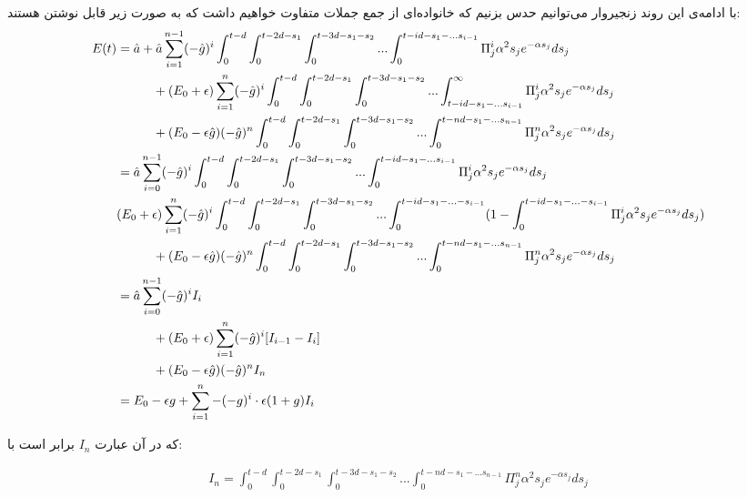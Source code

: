 \begin{landscape}
با ادامه‌ی این روند زنجیروار می‌توانیم حدس بزنیم که خانواده‌ای از جمع جملات متفاوت خواهیم داشت که به صورت زیر قابل نوشتن هستند:
\begin{align}
	E(t) &= \hat{a} + \hat{a} \sum^{n - 1}_{i=1} (-\hat{g})^i \int_{0}^{t - d} \int_{0}^{t - 2d - s_1} \int_{0}^{t - 3d - s_1 - s_2} ... \int_{0}^{t - id - s_1 - ... s_{i-1}} \Pi^i_j \alpha^2 s_j e^{-\alpha s_j} ds_j \\
	&\hspace{1 cm} + (E_0 + \epsilon) \sum^{n}_{i=1} (-\hat{g})^i \int_{0}^{t - d} \int_{0}^{t - 2d - s_1} \int_{0}^{t - 3d - s_1 - s_2} ... \int_{t - id - s_1 - ... s_{i-1}}^{\infty} \Pi^i_j \alpha^2 s_j e^{-\alpha s_j} ds_j \\
	&\hspace{1 cm} + (E_0 - \epsilon \hat{g}) (-\hat{g})^n \int_{0}^{t - d} \int_{0}^{t - 2d - s_1} \int_{0}^{t - 3d - s_1 - s_2} ... \int_{0}^{t - nd - s_1 - ... s_{n-1}} \Pi^n_j \alpha^2 s_j e^{-\alpha s_j} ds_j \\
	&= \hat{a} \sum^{n - 1}_{i=0} (-\hat{g})^i \int_{0}^{t - d} \int_{0}^{t - 2d - s_1} \int_{0}^{t - 3d - s_1 - s_2} ... \int_{0}^{t - id - s_1 - ... s_{i-1}} \Pi^i_j \alpha^2 s_j e^{-\alpha s_j} ds_j \\
	& (E_0 + \epsilon) \sum^{n}_{i=1} (-\hat{g})^i \int_{0}^{t - d} \int_{0}^{t - 2d - s_1} \int_{0}^{t - 3d - s_1 - s_2} ... \int_0^{t - id - s_1 - ... - s_{i-1}} (1 - \int_{0}^{t - id - s_1 - ... - s_{i-1}} \Pi^i_j \alpha^2 s_j e^{-\alpha s_j} ds_j )\\
	&\hspace{1 cm} + (E_0 - \epsilon \hat{g}) (-\hat{g})^n \int_{0}^{t - d} \int_{0}^{t - 2d - s_1} \int_{0}^{t - 3d - s_1 - s_2} ... \int_{0}^{t - nd - s_1 - ... s_{n-1}} \Pi^n_j \alpha^2 s_j e^{-\alpha s_j} ds_j\\
	&= \hat{a} \sum^{n - 1}_{i=0} (-\hat{g})^i I_i\\
	&\hspace{1 cm} + (E_0 + \epsilon) \sum^{n}_{i=1} (-\hat{g})^i [I_{i-1} - I_{i}]  \\
	&\hspace{1 cm} + (E_0 - \epsilon \hat{g}) (-\hat{g})^n I_n \\
	&= E_0 - \epsilon g + \sum^{n}_{i=1} - (-g)^i \cdot \epsilon(1+g) I_{i}
\end{align}
\end{landscape}
که در آن عبارت 
$I_n$
برابر است با:

\begin{align}
	I_n = \int_{0}^{t - d} \int_{0}^{t - 2d - s_1} \int_{0}^{t - 3d - s_1 - s_2} ... \int_{0}^{t - nd - s_1 - ... s_{n-1}} \Pi^n_j \alpha^2 s_j e^{-\alpha s_j} ds_j
	\label{eq:spikes_sandwiches}
\end{align}

